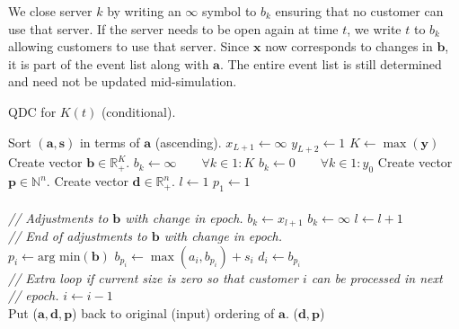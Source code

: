 \documentclass[article]{jss}
\begin{document}
We close server $k$ by writing an $\infty$ symbol to $b_k$ ensuring that no customer can use that server. If the server needs to be open again at time $t$, we write $t$ to $b_k$ allowing customers to use that server. Since $\mathbf{x}$ now corresponds to changes in $\mathbf{b}$, it is part of the event list along with $\mathbf{a}$. The entire event list is still determined and need not be updated mid-simulation. 

\begin{algorithm}[t!]
\caption{QDC for $K(t)$ (conditional).}
\label{alg:changing_servers}
\begin{algorithmic}[1]
\State Sort $(\mathbf{a}, \mathbf{s})$ in terms of $\mathbf{a}$ (ascending).
\State $x_{L+1} \leftarrow \infty$
\State $y_{L+2} \leftarrow 1$
\State $K \leftarrow \max(\mathbf{y})$
\State Create vector $\mathbf{b} \in \mathbb{R}_{\text{+}}^{K}$. 
\State $b_k \leftarrow \infty \quad \quad \forall k \in 1:K $
\State $b_k \leftarrow 0 \quad \quad \forall k \in 1:y_0 $
\State Create vector $\mathbf{p} \in \mathbb{N}^{n}$.
\State Create vector $\mathbf{d} \in \mathbb{R}_{+}^{n}$.
\State $l \leftarrow 1$
\State $p_1 \leftarrow 1$ 
 \\ \\

\hspace{10mm} \textit{// Adjustments to $\mathbf{b}$ with change in epoch.}
      	\State $b_k \leftarrow x_{l+1}$ 
      \EndFor
    \EndIf
        \State $b_k \leftarrow \infty$ 
      \EndFor
    \EndIf
    \State $l \leftarrow l + 1$
  \EndIf \\ 
 \hspace{10mm} \textit{// End of adjustments to $\mathbf{b}$ with change in epoch.} \\
  \State $p_i \leftarrow \text{arg min}(\mathbf{b}) $
  \State $b_{p_i} \leftarrow \max(a_i, b_{p_i}) + s_i $
  \State $d_i \leftarrow b_{p_i}$ \\ 
  \hspace{10mm}
  \textit{// Extra loop if current size is zero so that customer $i$ can be processed in next}\\
  \hspace{10mm}
  \textit{// epoch.}
  	\State $i \leftarrow i - 1$
  \EndIf \\
\EndFor 
\State Put ($\mathbf{a}, \mathbf{d}, \mathbf{p}$) back to original (input) ordering of $\mathbf{a}$.
\State \Return ($\mathbf{d}, \mathbf{p}$)
\EndFunction
\end{algorithmic}
\end{algorithm}
\end{document}
